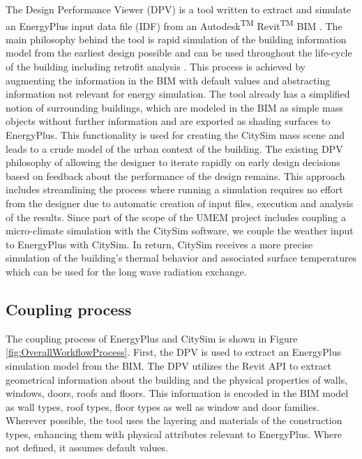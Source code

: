 \documentclass{tBPS2e}
\theoremstyle{plain}
\theoremstyle{definition}
\theoremstyle{remark}
\begin{document}
The Design Performance Viewer (DPV) is a tool written to extract and simulate an EnergyPlus input data file (IDF) from an Autodesk\textsuperscript{TM} Revit\textsuperscript{TM} BIM \citep{Schlueter2009}. The main philosophy behind the tool is rapid simulation
of the building information model from the earliest design possible and can be used throughout the life-cycle of the building including retrofit analysis \citep{Miller:2014tu}. This process is achieved by augmenting the information in the BIM with default values and abstracting information not relevant for energy simulation. The tool already has a simplified notion of surrounding buildings, which are modeled in the BIM as simple mass objects without further information and are exported as shading surfaces to EnergyPlus. This functionality is used for creating the CitySim mass scene and leads to a crude model of the urban context of the building. The existing DPV philosophy of allowing the designer to iterate rapidly on early design decisions based on feedback about the performance of the design remains. This approach includes streamlining the process where running a simulation requires no effort from the designer due to automatic creation of input files, execution and analysis of the results. Since part of the scope of the UMEM project includes coupling a micro-climate simulation with the CitySim software, we couple the weather input to EnergyPlus with CitySim.  In return, CitySim receives a more precise simulation of the building's thermal behavior and associated surface temperatures which can be used for the long wave radiation exchange. 

\subsection{Coupling process}
The coupling process of EnergyPlus and CitySim is shown in Figure \ref{fig:OverallWorkflowProcess}. First, the DPV is used to extract an EnergyPlus simulation model from the BIM. The DPV utilizes the Revit API to extract geometrical information about the
building and the physical properties of walls, windows, doors, roofs and
floors. This information is encoded in the BIM model as wall types, roof types,
floor types as well as window and door families. Wherever possible, the tool
uses the layering and materials of the construction types, enhancing them with
physical attributes relevant to EnergyPlus. Where not defined, it assumes
default values.
\end{document}
